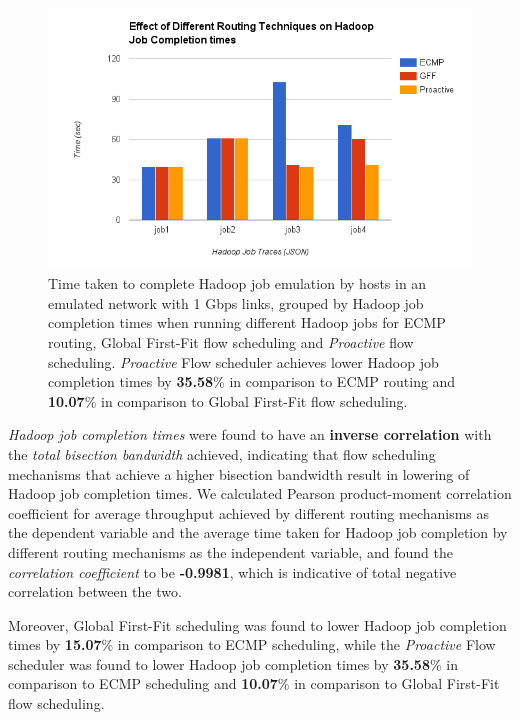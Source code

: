 \begin{figure}[!ht]
	\centerline{\includegraphics[scale=0.66]{graphics/chapter6/RoutingVJobCompletion.png}}
	\caption{Time taken to complete Hadoop job emulation by hosts in an emulated network with 1 Gbps links, grouped by Hadoop job completion times when running different Hadoop jobs for ECMP routing, Global First-Fit flow scheduling and \textit{Proactive} flow scheduling. \textit{Proactive} Flow scheduler achieves  lower Hadoop job completion times by \textbf{35.58}\% in comparison to ECMP routing and \textbf{10.07}\% in comparison to Global First-Fit flow scheduling.}
	\label{fig:RoutingVJobCompletion}
\end{figure}


\textit{Hadoop job completion times} were found to have an  \textbf{inverse correlation} with the \textit{total bisection bandwidth} achieved, indicating that flow scheduling mechanisms that achieve a higher bisection bandwidth result in lowering of Hadoop job completion times. We calculated Pearson product-moment correlation coefficient for average throughput achieved by different routing mechanisms as the dependent variable and the average time taken for Hadoop job completion by different routing mechanisms as the independent variable, and found the \textit{correlation coefficient} to be \textbf{-0.9981}, which is indicative of total negative correlation between the two. 

Moreover, Global First-Fit scheduling was found to lower Hadoop job completion times by \textbf{15.07}\% in comparison to ECMP scheduling, while the \textit{Proactive} Flow scheduler was found to lower Hadoop job completion times by \textbf{35.58}\% in comparison to ECMP scheduling and \textbf{10.07}\% in comparison to Global First-Fit flow scheduling. 


